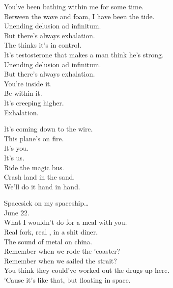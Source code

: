 
You've been bathing within me for some time. \\
Between the wave and foam, I have been the tide. \\
Unending delusion ad infinitum. \\
But there's always exhalation. \\
The  thinks it's in control. \\
It's testosterone that makes a man think he's strong. \\
Unending delusion ad infinitum. \\
But there's always exhalation. \\

You're inside it. \\
Be within it. \\
It's creeping higher. \\
Exhalation. \\


It's coming down to the wire. \\
This plane's on fire. \\
It's you. \\
It's us. \\
Ride the magic bus. \\
Crash land in the sand. \\
We'll do it hand in hand. \\





Spacesick on my spaceship… \\

June 22. \\
What I wouldn't do for a meal with you. \\
Real fork, real , in a shit diner. \\
The sound of metal on china. \\
Remember when we rode the 'coaster? \\
Remember when we sailed the strait? \\
You think they could've worked out the drugs up here. \\
'Cause it's like that, but floating in space. \\

